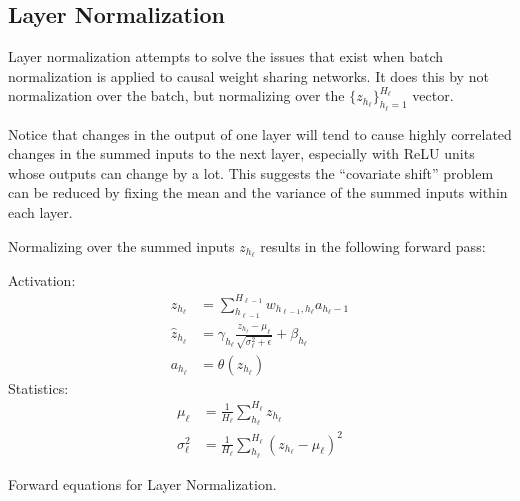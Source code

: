 \subsection{Layer Normalization}

Layer normalization attempts to solve the issues that exist when batch normalization is applied to causal weight sharing networks. It does this by not normalization over the batch, but normalizing over the $\{z_{h_\ell}\}_{h_\ell=1}^{H_\ell}$ vector. \cite{layer-normalization}

\begin{displayquote}
Notice that changes in the output of one layer will tend to cause highly correlated changes in the summed inputs to the next layer, especially with ReLU units whose outputs can change by a lot. This suggests the “covariate shift” problem can be reduced by fixing the mean and the variance of the summed inputs within each layer. 
\end{displayquote}

Normalizing over the summed inputs $z_{h_\ell}$ results in the following forward pass:
\begin{equationbox}[H]
Activation:
\begin{equation*}
\begin{aligned}
z_{h_\ell} &= \sum_{h_{\ell-1}}^{H_{\ell-1}} w_{h_{\ell-1},h_\ell} a_{h_\ell-1} \\
\hat{z}_{h_\ell} &= \gamma_{h_\ell} \frac{z_{h_\ell} - \mu_{\ell}}{\sqrt{\sigma_{\ell}^2 + \epsilon}} + \beta_{h_\ell} \\
a_{h_\ell} &= \theta\left(z_{h_\ell}\right)
\end{aligned}
\end{equation*}
Statistics:
\begin{equation*}
\begin{aligned}
\mu_{\ell} &= \frac{1}{H_\ell} \sum_{h_\ell}^{H_\ell} z_{h_\ell} \\
\sigma_{\ell}^2 &= \frac{1}{H_\ell} \sum_{h_\ell}^{H_\ell} (z_{h_\ell} - \mu_{\ell})^2
\end{aligned}
\end{equation*}
\caption{Forward equations for Layer Normalization.}
\end{equationbox}

